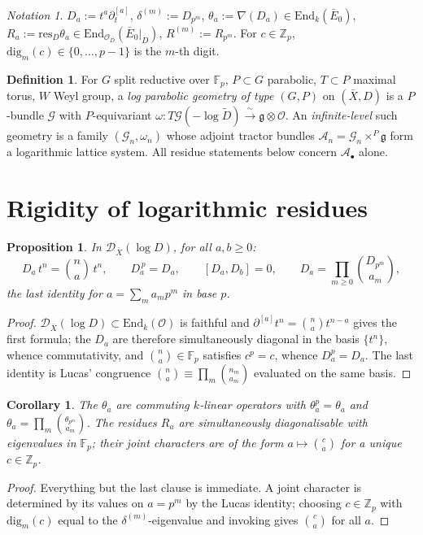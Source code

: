 \documentclass[11pt,reqno]{amsart}
\newcommand{\Zp}{\mathbb{Z}_p}
\newcommand{\Fp}{\mathbb{F}_p}
\newcommand{\cO}{\mathcal{O}}
\newcommand{\cD}{\mathcal{D}}
\newcommand{\cG}{\mathcal{G}}
\newcommand{\cA}{\mathcal{A}}
\newcommand{\fg}{\mathfrak{g}}
\newcommand{\End}{\mathrm{End}}
\newcommand{\res}{\mathrm{res}}
\newcommand{\dig}{\mathrm{dig}}
\newcommand{\isoto}{\xrightarrow{\ \sim\ }}
\theoremstyle{plain}
\newtheorem{proposition}[theorem]{Proposition}
\newtheorem{corollary}[theorem]{Corollary}
\theoremstyle{definition}
\newtheorem{definition}[theorem]{Definition}
\theoremstyle{remark}
\newtheorem{notation}[theorem]{Notation}
\numberwithin{equation}{section}
\begin{document}
\begin{notation}\label{not:Da}
$D_a:=t^a\partial_t^{[a]}$, $\delta^{(m)}:=D_{p^m}$,
$\theta_a:=\nabla(D_a)\in\End_k(\bar E_0)$,
$R_a:=\res_D\theta_a\in\End_{\cO_D}(\bar E_0|_D)$, $R^{(m)}:=R_{p^m}$.
For $c\in\Zp$, $\dig_m(c)\in\{0,\dots,p-1\}$ is the $m$-th digit.
\end{notation}

\begin{definition}\label{def:logpar}
For $G$ split reductive over $\Fp$, $P\subset G$ parabolic, $T\subset P$
maximal torus, $W$ Weyl group, a \emph{log parabolic geometry of type
$(G,P)$} on $(\bar X,D)$ is a $P$-bundle $\cG$ with $P$-equivariant
$\omega\colon T\cG(-\log\tilde D)\isoto\fg\otimes\cO$.  An
\emph{infinite-level} such geometry is a family $(\cG_n,\omega_n)$ whose
adjoint tractor bundles $\cA_n=\cG_n\times^P\fg$ form a logarithmic
lattice system.  All residue statements below concern $\cA_\bullet$ alone.
\end{definition}

\section{Rigidity of logarithmic residues}\label{sec:rigidity}

\begin{proposition}\label{prop:idempotent}
In $\cD_{\bar X}(\log D)$, for all $a,b\ge0$:
\[
   D_a\,t^n=\binom na\,t^n,\qquad D_a^{\,p}=D_a,\qquad [D_a,D_b]=0,
   \qquad D_a=\prod_{m\ge0}\binom{D_{p^m}}{a_m},
\]
the last identity for $a=\sum_ma_mp^m$ in base $p$.
\end{proposition}
\begin{proof}
$\cD_{\bar X}(\log D)\subset\End_k(\cO)$ is faithful and
$\partial^{[a]}t^n=\binom nat^{n-a}$ gives the first formula; the $D_a$ are
therefore simultaneously diagonal in the basis $\{t^n\}$, whence
commutativity, and $\binom na\in\Fp$ satisfies $c^p=c$, whence
$D_a^p=D_a$.  The last identity is Lucas' congruence
$\binom na\equiv\prod_m\binom{n_m}{a_m}$ evaluated on the same basis.
\end{proof}

\begin{corollary}\label{cor:rigidity}
The $\theta_a$ are commuting $k$-linear operators with
$\theta_a^p=\theta_a$ and $\theta_a=\prod_m\binom{\theta_{p^m}}{a_m}$.
The residues $R_a$ are simultaneously diagonalisable with eigenvalues in
$\Fp$; their joint characters are of the form
$a\mapsto\binom{c}{a}$ for a unique $c\in\Zp$.
\end{corollary}
\begin{proof}
Everything but the last clause is immediate.  A joint character is
determined by its values on $a=p^m$ by the Lucas identity; choosing
$c\in\Zp$ with $\dig_m(c)$ equal to the $\delta^{(m)}$-eigenvalue and
invoking  gives $\binom{c}{a}$ for all $a$.
\end{proof}
\end{document}
